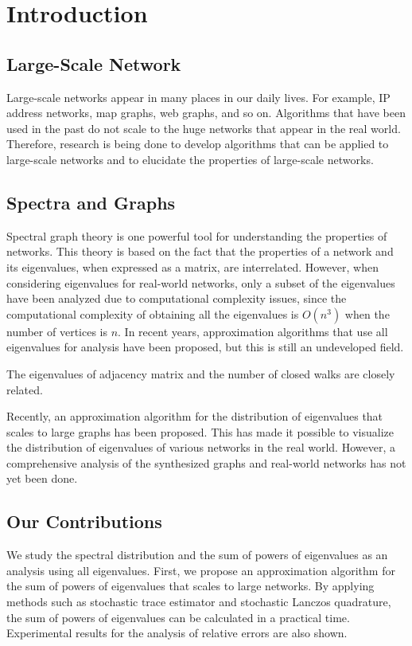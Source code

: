 \documentclass[senior,final,11pt]{iscs-thesis}
\begin{document}
\frontmatter %
\tableofcontents %
\mainmatter %

\chapter{Introduction}
\section{Large-Scale Network}
Large-scale networks appear in many places in our daily lives. For example, IP address networks, map graphs, web graphs, and so on. Algorithms that have been used in the past do not scale to the huge networks that appear in the real world. Therefore, research is being done to develop algorithms that can be applied to large-scale networks and to elucidate the properties of large-scale networks.

\section{Spectra and Graphs}
Spectral graph theory is one powerful tool for understanding the properties of networks. This theory is based on the fact that the properties of a network and its eigenvalues, when expressed as a matrix, are interrelated. However, when considering eigenvalues for real-world networks, only a subset of the eigenvalues have been analyzed due to computational complexity issues, since the computational complexity of obtaining all the eigenvalues is $O(n^3)$ when the number of vertices is $n$. In recent years, approximation algorithms that use all eigenvalues for analysis have been proposed, but this is still an undeveloped field.

The eigenvalues of adjacency matrix and the number of closed walks are closely related\cite{butler2008eigenvalues}.

Recently, an approximation algorithm for the distribution of eigenvalues that scales to large graphs has been proposed. This has made it possible to visualize the distribution of eigenvalues of various networks in the real world. However, a comprehensive analysis of the synthesized graphs and real-world networks has not yet been done.


\section{Our Contributions}
We study the spectral distribution and the sum of powers of eigenvalues as an analysis using all eigenvalues. First, we propose an approximation algorithm for the sum of powers of eigenvalues that scales to large networks. By applying methods such as stochastic trace estimator and stochastic Lanczos quadrature, the sum of powers of eigenvalues can be calculated in a practical time. Experimental results for the analysis of relative errors are also shown.
\end{document}
